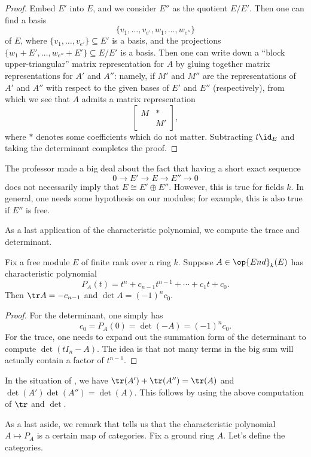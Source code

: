 \documentclass[../notes.tex]{subfiles}
\begin{document}
\begin{proof}
	Embed $E'$ into $E$, and we consider $E''$ as the quotient $E/E'$. Then one can find a basis
	\[\{v_1,\ldots,v_{e'},w_1,\ldots,w_{e''}\}\]
	of $E$, where $\{v_1,\ldots,v_{e'}\}\subseteq E'$ is a basis, and the projections $\{w_1+E',\ldots,w_{e''}+E'\}\subseteq E/E'$ is a basis. Then one can write down a ``block upper-triangular'' matrix representation for $A$ by gluing together matrix representations for $A'$ and $A''$: namely, if $M'$ and $M''$ are the representations of $A'$ and $A''$ with respect to the given bases of $E'$ and $E''$ (respectively), from which we see that $A$ admits a matrix representation
	\[\begin{bmatrix}
		M & * \\ & M'
	\end{bmatrix},\]
	where $*$ denotes some coefficients which do not matter. Subtracting $t\id_E$ and taking the determinant completes the proof.
\end{proof}
\begin{remark}
	The professor made a big deal about the fact that having a short exact sequence
	\[0\to E'\to E\to E''\to0\]
	does not necessarily imply that $E\cong E'\oplus E''$. However, this is true for fields $k$. In general, one needs some hypothesis on our modules; for example, this is also true if $E''$ is free.
\end{remark}
As a last application of the characteristic polynomial, we compute the trace and determinant.
\begin{proposition}
	Fix a free module $E$ of finite rank over a ring $k$. Suppose $A\in\op{End}_k(E)$ has characteristic polynomial
	\[P_A(t)=t^n+c_{n-1}t^{n-1}+\cdots+c_1t+c_0.\]
	Then $\tr A=-c_{n-1}$ and $\det A=(-1)^nc_0$.
\end{proposition}
\begin{proof}
	For the determinant, one simply has
	\[c_0=P_A(0)=\det(-A)=(-1)^nc_0.\]
	For the trace, one needs to expand out the summation form of the determinant to compute $\det(tI_n-A)$. The idea is that not many terms in the big sum will actually contain a factor of $t^{n-1}$.
\end{proof}
\begin{remark}
	In the situation of , we have $\tr(A')+\tr(A'')=\tr (A)$ and $\det(A')\det(A'')=\det (A)$. This follows by using the above computation of $\tr$ and $\det$.
\end{remark}
As a last aside, we remark that  tells us that the characteristic polynomial $A\mapsto P_A$ is a certain map of categories. Fix a ground ring $A$. Let's define the categories.
\end{document}
